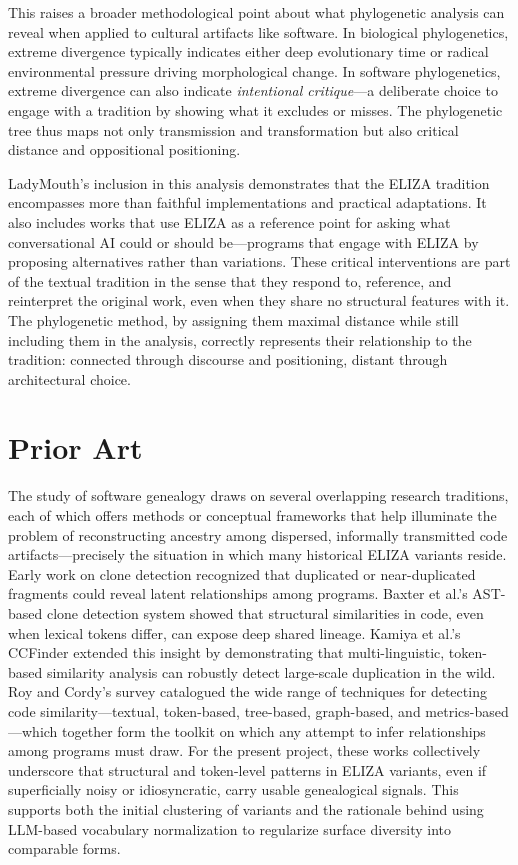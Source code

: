 \documentclass{article}
\begin{document}
This raises a broader methodological point about what phylogenetic analysis can reveal when applied to cultural artifacts like software. In biological phylogenetics, extreme divergence typically indicates either deep evolutionary time or radical environmental pressure driving morphological change. In software phylogenetics, extreme divergence can also indicate \emph{intentional critique}—a deliberate choice to engage with a tradition by showing what it excludes or misses. The phylogenetic tree thus maps not only transmission and transformation but also critical distance and oppositional positioning.

LadyMouth's inclusion in this analysis demonstrates that the ELIZA tradition encompasses more than faithful implementations and practical adaptations. It also includes works that use ELIZA as a reference point for asking what conversational AI could or should be—programs that engage with ELIZA by proposing alternatives rather than variations. These critical interventions are part of the textual tradition in the sense that they respond to, reference, and reinterpret the original work, even when they share no structural features with it. The phylogenetic method, by assigning them maximal distance while still including them in the analysis, correctly represents their relationship to the tradition: connected through discourse and positioning, distant through architectural choice.



\section{Prior Art}

The study of software genealogy draws on several overlapping research traditions, each of which offers methods or conceptual frameworks that help illuminate the problem of reconstructing ancestry among dispersed, informally transmitted code artifacts—precisely the situation in which many historical ELIZA variants reside. Early work on clone detection recognized that duplicated or near-duplicated fragments could reveal latent relationships among programs. Baxter et al.’s AST-based clone detection system \cite{baxter1998clone} showed that structural similarities in code, even when lexical tokens differ, can expose deep shared lineage. Kamiya et al.’s CCFinder \cite{kamiya2002ccfinder} extended this insight by demonstrating that multi-linguistic, token-based similarity analysis can robustly detect large-scale duplication in the wild. Roy and Cordy’s survey \cite{roy2007clone} catalogued the wide range of techniques for detecting code similarity---textual, token-based, tree-based, graph-based, and metrics-based---which together form the toolkit on which any attempt to infer relationships among programs must draw. For the present project, these works collectively underscore that structural and token-level patterns in ELIZA variants, even if superficially noisy or idiosyncratic, carry usable genealogical signals. This supports both the initial clustering of variants and the rationale behind using LLM-based vocabulary normalization to regularize surface diversity into comparable forms.
\end{document}
